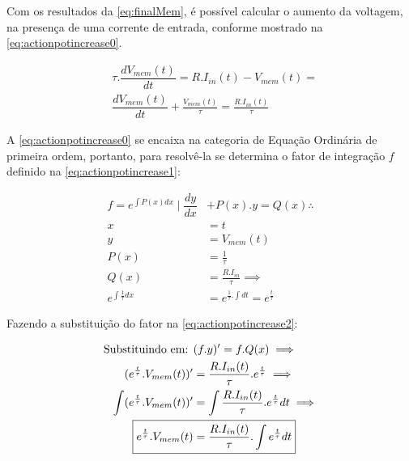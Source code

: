 			\par Com os resultados da \autoref{eq:finalMem}, é possível calcular o aumento da voltagem, na presença de uma corrente de entrada, conforme mostrado na \autoref{eq:actionpotincrease0}.
			
			\begin{equation}
				\label{eq:actionpotincrease0}
				\begin{aligned}
					&\tau.\dfrac{dV_{mem}(t)}{dt} = R.I_{in}(t) - V_{mem}(t) = \\
					&\dfrac{dV_{mem}(t)}{dt} + \frac{V_{mem}(t)}{\tau} = \frac{R.I_{in}(t)}{\tau}
				\end{aligned}
			\end{equation}
			
			\par A \autoref{eq:actionpotincrease0} se encaixa na categoria de Equação Ordinária de primeira ordem, portanto, para resolvê-la se determina o fator de integração $f$ definido na \autoref{eq:actionpotincrease1}:
			
			\begin{equation}
				\label{eq:actionpotincrease1}
				\begin{aligned}
					f = e^{\int P(x) dx} \mid \dfrac{dy}{dx}&+P(x).y=Q(x) \therefore\\
					x &= t \\
					y &= V_{mem}(t) \\
					P(x) &= \frac{1}{\tau} \\
					Q(x) &= \frac{R.I_{in}}{\tau} \implies \\
					e^{\int \frac{1}{\tau} dx} &= e^{\frac{1}{\tau}.\int dt} = \boxed{e^{\frac{t}{\tau}}}
				\end{aligned}
			\end{equation}
			
			\par Fazendo a substituição do fator na \autoref{eq:actionpotincrease2}:
			
			\begin{equation}
				\label{eq:actionpotincrease2}
				\begin{aligned}
					\text{Substituindo em: } &(f.y)' = f.Q(x) \implies \\
					(e^{\frac{t}{\tau}}.V_{mem}(t))' &= \frac{R.I_{in}(t)}{\tau}.e^{\frac{t}{\tau}} \implies \\
					\int (e^{\frac{t}{\tau}}.V_{mem}(t))' &= \int \frac{R.I_{in}(t)}{\tau}.e^{\frac{t}{\tau}} dt \implies \\
					\Aboxed{e^{\frac{t}{\tau}}.V_{mem}(t) &= \frac{R.I_{in}(t)}{\tau}.\int e^{\frac{t}{\tau}} dt}
				\end{aligned}
			\end{equation}
			
